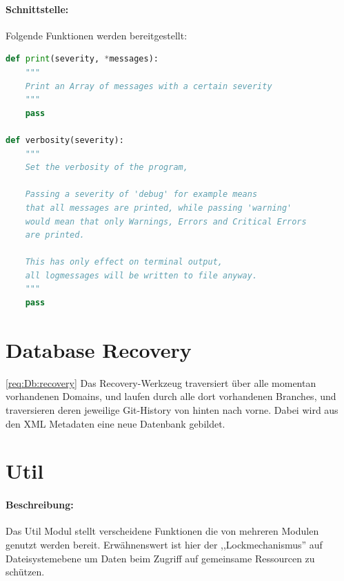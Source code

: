 \paragraph{Schnittstelle:}
\label{par:schnittstelle_}
Folgende Funktionen werden bereitgestellt:
\begin{lstlisting}[language=python]
def print(severity, *messages):
    """
    Print an Array of messages with a certain severity
    """
    pass

def verbosity(severity):
    """
    Set the verbosity of the program, 

    Passing a severity of 'debug' for example means
    that all messages are printed, while passing 'warning'
    would mean that only Warnings, Errors and Critical Errors 
    are printed.

    This has only effect on terminal output,
    all logmessages will be written to file anyway.
    """
    pass
\end{lstlisting}

\section{Database Recovery} 
\label{sec:database_recovery}
\ref{req:Db:recovery}
Das Recovery-Werkzeug traversiert über alle momentan vorhandenen Domains, und laufen durch alle dort vorhandenen Branches, und traversieren deren 
jeweilige Git-History von hinten nach vorne.
Dabei wird aus den XML Metadaten eine neue Datenbank gebildet.

\section{Util} 
\label{sec:util}
\paragraph{Beschreibung:}
\label{par:beschreibung_}
Das Util Modul stellt verscheidene Funktionen die von mehreren Modulen genutzt werden bereit.
Erwähnenswert ist hier der ,,Lockmechanismus''
auf Dateisystemebene um Daten beim Zugriff auf gemeinsame  Ressourcen zu schützen.

